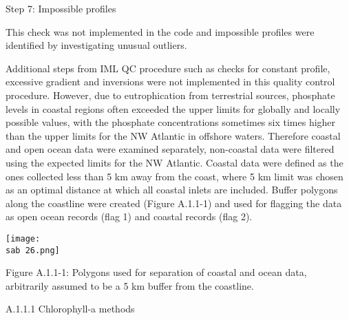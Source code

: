 \documentclass[letterpaper,portrait,12pt]{scrartcl}
\numberwithin{equation}{section}		%
\numberwithin{figure}{section}			%
\numberwithin{table}{section}				%
\newcommand{\sab}{\string~/ecomod_data/mpa/sab/}   %
\begin{document}
Step 7: Impossible profiles




This check was not implemented in the code and impossible profiles were identified by investigating unusual outliers.









Additional steps from IML QC procedure such as checks for constant profile, excessive gradient and inversions were not implemented in this quality control procedure. However, due to eutrophication from terrestrial sources, phosphate levels in coastal regions often exceeded the upper limits for globally and locally possible values, with the phosphate concentrations sometimes six times higher than the upper limits for the NW Atlantic in offshore waters. Therefore coastal and open ocean data were examined separately, non-coastal data were filtered using the expected limits for the NW Atlantic. Coastal data were defined as the ones collected less than 5 km away from the coast, where 5 km limit was chosen as an optimal distance at which all coastal inlets are included. Buffer polygons along the coastline were created (Figure A.1.1-1) and used for flagging the data as open ocean records (flag 1) and coastal records (flag 2).









\texttt{[image: \\sab 26.png]}





Figure A.1.1-1: Polygons used for separation of coastal and ocean data, arbitrarily assumed to be a 5 km buffer from the coastline. 
























A.1.1.1 Chlorophyll-a methods
\end{document}
